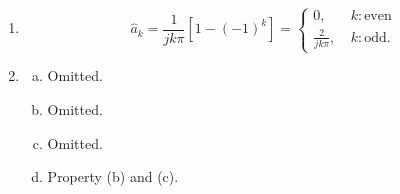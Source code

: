 \documentclass{article}
\begin{document}
        \begin{enumerate}
            \item \[
                \hat{a}_k = \frac{1}{jk\pi}[1 - (-1)^{k}] = 
                \begin{cases}
                    0,\ & k : \text{even} \\
                    \frac{2}{jk\pi},\ & k : \text{odd}.
                \end{cases}
            \]
            
            \item
            \begin{enumerate}[(a)]
                \item Omitted.
                \item Omitted.
                \item Omitted.
                \item Property (b) and (c). 
            \end{enumerate}	
            

\end{enumerate}
\end{document}
